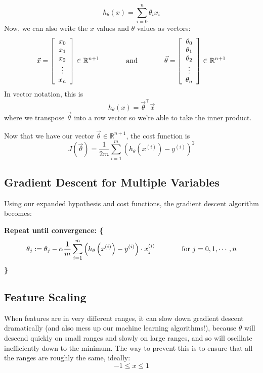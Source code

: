 \begin{equation}
h_\theta\left( x\right) = \sum_{i=0}^n \theta_i x_i
\end{equation}
Now, we can also write the $x$ values and $\theta$ values as vectors:
$$
\vec{x} = \left[ \begin{array}{c}
x_0 \\
x_1 \\
x_2 \\
\vdots \\
x_n
\end{array} \right] \in \mathbb{R}^{n+1} 
~~\mbox{\;\;\;\;\;\;\;\;\;\; and \;\;\;\;\;\;\;\;\;\;}~~
\vec{\theta} = \left[\begin{array}{c}
\theta_0 \\
\theta_1 \\
\theta_2 \\
\vdots \\
\theta_n \end{array}\right] \in \mathbb{R}^{n+1}
$$
In vector notation, this is 
\begin{equation}
h_\theta\left( x \right) = \vec{\theta}^\intercal\vec{x}
\end{equation}
where we transpose $\vec{\theta}$ into a row vector so we're able to take the inner product. 

Now that we have our vector $\vec{\theta} \in \mathbb{R}^{n+1}$, the cost function is
\begin{equation}
J\left(\vec{\theta}\right) = \frac{1}{2m}\sum_{i=1}^m \left( h_\theta\left( x^{\left( i \right)} \right) - y^{\left( i \right)} \right)^2
\end{equation}

\subsection{Gradient Descent for Multiple Variables}
Using our expanded hypothesis and cost functions, the gradient descent algorithm becomes:


\textbf{Repeat until convergence: \{ }
\begin{equation}
\theta_j := \theta_j - \alpha\frac{1}{m} \sum_{i=1}^m \left( h_\theta\left( x^{\left(i\right)} \right) - y^{\left(i\right)} \right) \cdot x_j^{\left( i \right)} ~~\mbox{\;\;\;\;\;\;\;\;\;\; for } j = 0, 1, \cdots, n
\end{equation}
\textbf{ \} }

\subsection{Feature Scaling}
When features are in very different ranges, it can slow down gradient descent dramatically (and also mess up our machine learning algorithms!), because $\theta$ will descend quickly on small ranges and slowly on large ranges, and so will oscillate inefficiently down to the minimum. The way to prevent this is to ensure that all the ranges are roughly the same, ideally:
$$ -1 \leq x \leq 1 $$

